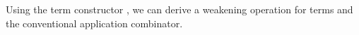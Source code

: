 Using the term constructor , we can derive a weakening operation for terms and the conventional application combinator.
\begin{code}%
\>[0]%
\>[4]\AgdaSymbol{:}\AgdaSpace{}%
\AgdaSpace{}%
\AgdaSymbol{\{}\AgdaSymbol{\}}\AgdaSpace{}%
\AgdaSymbol{\{}\AgdaSpace{}%
\AgdaSymbol{:}\AgdaSpace{}%
\AgdaSpace{}%
\AgdaSymbol{\}}\AgdaSpace{}%
\AgdaSymbol{\{}\AgdaSpace{}%
\AgdaSpace{}%
\AgdaSymbol{:}\AgdaSpace{}%
\AgdaSpace{}%
\AgdaSymbol{\}}\AgdaSpace{}%
\AgdaSpace{}%
\AgdaSpace{}%
\AgdaSpace{}%
\AgdaSpace{}%
\AgdaSpace{}%
\AgdaSpace{}%
\AgdaSymbol{(}\AgdaSpace{}%
\AgdaOperator{\AgdaInductiveConstructor{,}}\AgdaSpace{}%
\AgdaSymbol{)}\AgdaSpace{}%
\<%
\\
\>[0]\AgdaSpace{}%
\AgdaSymbol{\{}\AgdaSymbol{\}}\AgdaSpace{}%
\AgdaSymbol{\{}\AgdaSymbol{\}}\AgdaSpace{}%
\AgdaSymbol{\{}\AgdaSymbol{\}}\AgdaSpace{}%
\AgdaSpace{}%
\AgdaSymbol{=}\AgdaSpace{}%
\AgdaSpace{}%
\AgdaSpace{}%
\AgdaSymbol{(}\AgdaSpace{}%
\AgdaSymbol{(}\AgdaSpace{}%
\AgdaSymbol{(}\AgdaSpace{}%
\AgdaOperator{\AgdaInductiveConstructor{,}}\AgdaSpace{}%
\AgdaSymbol{)))}\<%
\\
%
\\[\AgdaEmptyExtraSkip]%
\>[0]\AgdaOperator{\AgdaFunction{\AgdaUnderscore{}\$\AgdaUnderscore{}}}\AgdaSpace{}%
\AgdaSymbol{:}\AgdaSpace{}%
\AgdaSpace{}%
\AgdaSymbol{\{}\AgdaSymbol{\}}\AgdaSpace{}%
\AgdaSymbol{\{}\AgdaSpace{}%
\AgdaSymbol{:}\AgdaSpace{}%
\AgdaSpace{}%
\AgdaSymbol{\}}\AgdaSpace{}%
\AgdaSymbol{\{}\AgdaSpace{}%
\AgdaSpace{}%
\AgdaSymbol{:}\AgdaSpace{}%
\AgdaSpace{}%
\AgdaSymbol{\}}\AgdaSpace{}%
\AgdaSpace{}%
\AgdaSpace{}%
\AgdaSpace{}%
\AgdaSymbol{(}\AgdaSpace{}%
\AgdaSpace{}%
\AgdaSymbol{)}\AgdaSpace{}%
\AgdaSpace{}%
\AgdaSpace{}%
\AgdaSpace{}%
\AgdaSpace{}%
\AgdaSpace{}%
\AgdaSpace{}%
\AgdaSpace{}%
\<%
\\
\>[0]\AgdaOperator{\AgdaFunction{\AgdaUnderscore{}\$\AgdaUnderscore{}}}\AgdaSpace{}%
\AgdaSymbol{\{}\AgdaSymbol{\}}\AgdaSpace{}%
\AgdaSymbol{\{}\AgdaSymbol{\}}\AgdaSpace{}%
\AgdaSpace{}%
\AgdaSpace{}%
\AgdaSymbol{=}\AgdaSpace{}%
\AgdaSpace{}%
\AgdaSymbol{(}\AgdaSpace{}%
\AgdaSymbol{)}\AgdaSpace{}%
\AgdaSymbol{(}\AgdaSpace{}%
\AgdaSpace{}%
\AgdaOperator{\AgdaInductiveConstructor{,}}\AgdaSpace{}%
\AgdaSymbol{)}\<%
\end{code}

